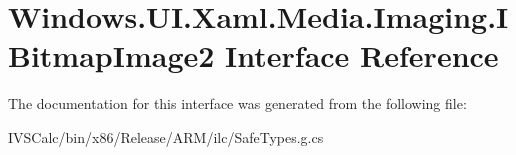 \hypertarget{interface_windows_1_1_u_i_1_1_xaml_1_1_media_1_1_imaging_1_1_i_bitmap_image2}{}\section{Windows.\+U\+I.\+Xaml.\+Media.\+Imaging.\+I\+Bitmap\+Image2 Interface Reference}
\label{interface_windows_1_1_u_i_1_1_xaml_1_1_media_1_1_imaging_1_1_i_bitmap_image2}


The documentation for this interface was generated from the following file\+:\begin{DoxyCompactItemize}
\item 
I\+V\+S\+Calc/bin/x86/\+Release/\+A\+R\+M/ilc/Safe\+Types.\+g.\+cs\end{DoxyCompactItemize}
